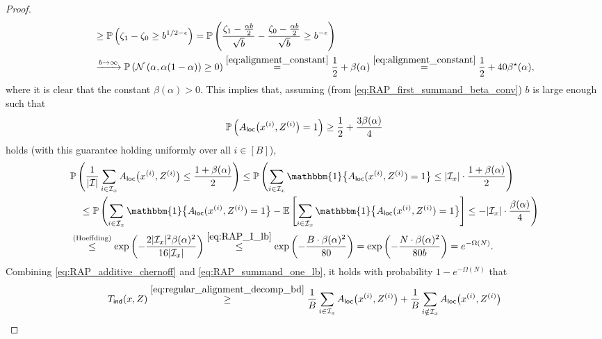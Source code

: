 \documentclass[11pt]{amsart}
\numberwithin{equation}{section}
\numberwithin{equation}{section}
\newcommand{\1}{\mathbbm{1}}
\newcommand{\E}{\mathbb{E}}
\newcommand{\Prob}{\mathbb{P}}
\newcommand{\ind}{\textup{\textsf{ind}}}
\newcommand{\loc}{\textup{\textsf{loc}}}
\theoremstyle{definition}
\begin{document}
\begin{appendices}
\begin{proof}
\begin{align}
        & \qquad \geq \Prob\left( \zeta_1 - \zeta_0 \geq b^{1/2-\epsilon} \right) = \Prob\left( \frac{\zeta_1 - \frac{\alpha b}{2}}{\sqrt{b}} - \frac{\zeta_0 - \frac{\alpha b}{2}}{\sqrt{b}} \geq b^{-\epsilon} \right) \nonumber \\
        & \qquad \xrightarrow{b \to \infty} \Prob\left( \mathcal N\left( \alpha, \alpha(1 - \alpha) \right) \geq 0 \right) \stackrel{\eqref{eq:alignment_constant}}{=} \frac{1}{2} + \beta(\alpha) \stackrel{\eqref{eq:alignment_constant}}{=} \frac{1}{2} + 40\beta^\star(\alpha), \label{eq:RAP_first_summand_beta_conv}
    \end{align}
    where it is clear that the constant $\beta(\alpha) > 0$. This implies that, assuming (from \eqref{eq:RAP_first_summand_beta_conv}) $b$ is large enough such that
    \begin{align*}
        \Prob\left( A_\loc\big(x^{(i)}, Z^{(i)}\big) = 1 \right) \geq \frac{1}{2} + \frac{3\beta(\alpha)}{4}
    \end{align*}
    holds (with this guarantee holding uniformly over all $i \in [B]$),
    \begin{align}
        & \Prob\left( \frac{1}{|\mathcal I|} \sum_{i \in \mathcal I_x} A_\loc\big(x^{(i)}, Z^{(i)}\big) \leq \frac{1+\beta(\alpha)}{2} \right) \leq \Prob\left( \sum_{i \in \mathcal I_x} \1\big\{ A_\loc(x^{(i)}, Z^{(i)}) = 1 \big\} \leq |\mathcal I_x| \cdot \frac{1+\beta(\alpha)}{2} \right) \nonumber \\
        & \quad \leq \Prob\left( \sum_{i \in \mathcal I_x} \1\big\{ A_\loc(x^{(i)}, Z^{(i)}) = 1 \big\} - \E\left[ \sum_{i \in \mathcal I_x} \1\big\{ A_\loc(x^{(i)}, Z^{(i)}) = 1 \big\} \right] \leq -|\mathcal I_x| \cdot \frac{\beta(\alpha)}{4} \right) \nonumber \\
        & \stackrel{\text{(Hoeffding)}}{\leq} \exp\left( - \frac{2|\mathcal I_x|^2 \beta(\alpha)^2}{16|\mathcal I_x|} \right) \stackrel{\eqref{eq:RAP_I_lb}}{\leq} \exp\left( -\frac{B \cdot \beta(\alpha)^2}{80} \right) = \exp\left( -\frac{N \cdot \beta(\alpha)^2}{80b} \right) = e^{-\Omega(N)}. \label{eq:RAP_summand_one_lb}
    \end{align}
    Combining \eqref{eq:RAP_additive_chernoff} and \eqref{eq:RAP_summand_one_lb}, it holds with probability $1-e^{-\Omega(N)}$ that
    \begin{align}
        T_\ind(x, Z) & \stackrel{\eqref{eq:regular_alignment_decomp_bd}}{\geq} \frac{1}{B} \sum_{i \in \mathcal I_x} A_\loc\big(x^{(i)}, Z^{(i)}\big) + \frac{1}{B} \sum_{i \notin \mathcal I_x} A_\loc\big(x^{(i)}, Z^{(i)}\big) \nonumber \\

\end{align}
\end{proof}
\end{appendices}
\end{document}
